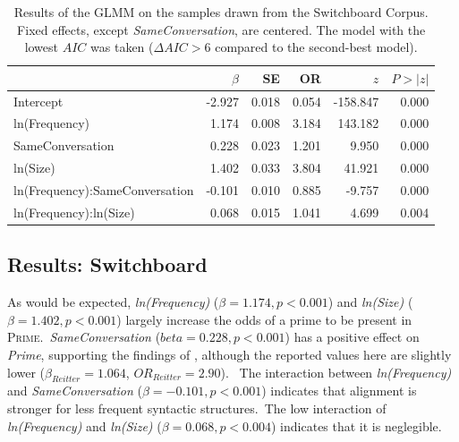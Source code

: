\documentclass[11pt]{article}
\begin{document}
\begin{table}
  \centering
  \begin{tabular}{lrrrrr}
    \hline
    &$\beta$&SE&OR& $z$& $P>|z|$\\
    \hline
    Intercept&
    -2.927& 0.018& 0.054&  -158.847& 0.000\\
    
    ln(Frequency)&
    1.174& 0.008& 3.184& 143.182& 0.000\\
    
    SameConversation&
    0.228& 0.023& 1.201& 9.950& 0.000\\
    
    ln(Size)&
    1.402& 0.033& 3.804& 41.921& 0.000\\
    ln(Frequency):SameConversation&
    -0.101& 0.010& 0.885& -9.757& 0.000\\
    ln(Frequency):ln(Size)&
    0.068& 0.015& 1.041& 4.699& 0.004\\
    \hline
    
  \end{tabular}
  \caption{\label{tab:human}
  Results of the GLMM on the samples drawn from the Switchboard Corpus. Fixed effects, except \textit{SameConversation}, are centered. The model with the lowest $AIC$ was taken ($\Delta AIC>6$ compared to the second-best model).}
  
\end{table}
\subsection{Results: Switchboard}
As would be expected, \textit{ln(Frequency)} ($\beta=1.174, p<0.001$) and \textit{ln(Size)} ($\beta=1.402, p<0.001$) largely increase the odds of a prime to be present in \textsc{Prime}.\
\textit{SameConversation} ($beta=0.228, p<0.001$) has a positive effect on \textit{Prime}, supporting the findings of \citealp{reitter2008context}, although the reported values here are slightly lower ($\beta_{Reitter}=1.064$, $OR_{Reitter} = 2.90$). \
The interaction between \textit{ln(Frequency)} and \textit{SameConversation} ($\beta=-0.101, p<0.001$) indicates that alignment is stronger for less frequent syntactic structures.\
The low interaction of \textit{ln(Frequency)} and \textit{ln(Size)} ($\beta=0.068, p<0.004$) indicates that it is neglegible.
\end{document}
